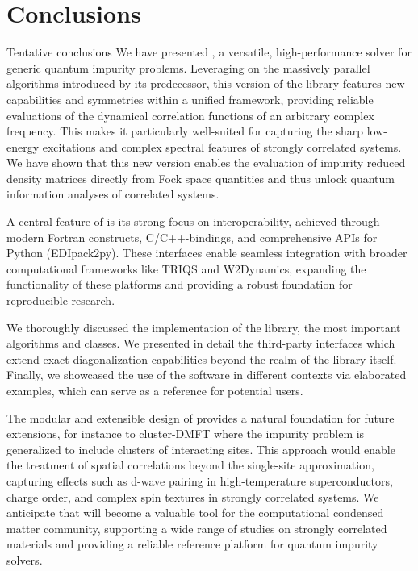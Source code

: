 \documentclass[edipack_sp.tex]{subfiles}
\begin{document}
\section{Conclusions}
{\color{red} Tentative conclusions}
We have presented \NAME{}, a versatile, high-performance solver for
generic quantum impurity problems. Leveraging on the massively
parallel algorithms introduced by its predecessor, this version of
the library features new capabilities and symmetries within a unified
framework, providing reliable evaluations of the dynamical correlation
functions of an arbitrary complex frequency.
This makes it particularly well-suited for capturing the sharp
low-energy excitations and complex spectral features of strongly
correlated systems. We have shown that this new version enables the evaluation of impurity
reduced density matrices directly from Fock space quantities and thus unlock 
quantum information analyses of correlated systems.  

A central feature of \NAME is its strong focus on interoperability,
achieved through modern Fortran constructs, C/C++-bindings, and
comprehensive APIs for Python (EDIpack2py). 
These interfaces enable seamless integration with broader
computational frameworks like TRIQS and W2Dynamics, expanding the
functionality of these platforms and providing a robust foundation for
reproducible research.

We thoroughly discussed the implementation of the \NAME library, the
most important algorithms and classes. We presented in
detail the third-party interfaces which extend exact diagonalization
capabilities beyond the realm of the library itself.   
Finally, we showcased the use of the \NAME software in different
contexts via elaborated examples, which can serve as a reference for potential users. 

The modular and extensible design of \NAME provides a
natural foundation for future extensions, for instance to cluster-DMFT where the
impurity problem is generalized to include clusters of interacting
sites. This approach would enable the treatment of spatial
correlations beyond the single-site approximation, capturing effects
such as d-wave pairing in high-temperature superconductors, charge
order, and complex spin textures in strongly correlated systems.
We anticipate that \NAME will become a valuable tool for the
computational condensed matter community, supporting a wide range of
studies on strongly correlated materials and providing a reliable
reference platform for quantum impurity solvers.
\end{document}
